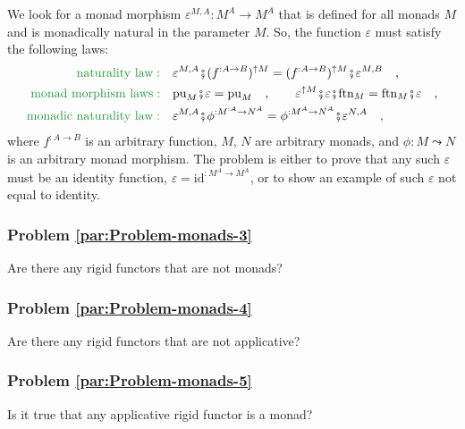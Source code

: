 We look for a monad morphism $\varepsilon^{M,A}:M^{A}\rightarrow M^{A}$
that is defined for all monads $M$ and is monadically natural in
the  parameter $M$. So, the function $\varepsilon$ must satisfy
the following laws:
\begin{align*}
{\color{greenunder}\text{naturality law}:}\quad & \varepsilon^{M,A}\bef(f^{:A\rightarrow B})^{\uparrow M}=(f^{:A\rightarrow B})^{\uparrow M}\bef\varepsilon^{M,B}\quad,\\
{\color{greenunder}\text{monad morphism laws}:}\quad & \text{pu}_{M}\bef\varepsilon=\text{pu}_{M}\quad,\quad\quad\varepsilon^{\uparrow M}\bef\varepsilon\bef\text{ftn}_{M}=\text{ftn}_{M}\bef\varepsilon\quad,\\
{\color{greenunder}\text{monadic naturality law}:}\quad & \varepsilon^{M,A}\bef\phi^{:M^{:A}\rightarrow N^{A}}=\phi^{:M^{A}\rightarrow N^{A}}\bef\varepsilon^{N,A}\quad,
\end{align*}
where $f^{:A\rightarrow B}$ is an arbitrary function, $M$, $N$
are arbitrary monads, and $\phi:M\leadsto N$ is an arbitrary monad
morphism. The problem is either to prove that any such $\varepsilon$
must be an identity function, $\varepsilon=\text{id}^{:M^{A}\rightarrow M^{A}}$,
or to show an example of such $\varepsilon$ not equal to identity.

\subsubsection{Problem \label{par:Problem-monads-3}\ref{par:Problem-monads-3}}

Are there any rigid functors that are not monads?

\subsubsection{Problem \label{par:Problem-monads-4}\ref{par:Problem-monads-4}}

Are there any rigid functors that are not applicative?

\subsubsection{Problem \label{par:Problem-monads-5}\ref{par:Problem-monads-5}}

Is it true that any applicative rigid functor is a monad?
